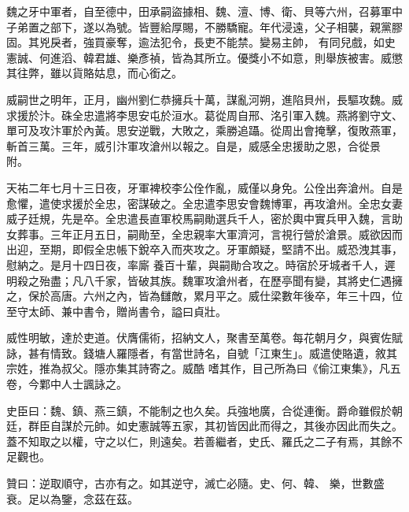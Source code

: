 \begin{pinyinscope}
 魏之牙中軍者，自至德中，田承嗣盜據相、魏、澶、博、衛、貝等六州，召募軍中子弟置之部下，遂以為號。皆豐給厚賜，不勝驕寵。年代浸遠，父子相襲，親黨膠固。其兇戾者，強買豪奪，逾法犯令，長吏不能禁。變易主帥，
 有同兒戲，如史憲誠、何進滔、韓君雄、樂彥禎，皆為其所立。優獎小不如意，則舉族被害。威懲其往弊，雖以貨賂姑息，而心銜之。



 威嗣世之明年，正月，幽州劉仁恭擁兵十萬，謀亂河朔，進陷貝州，長驅攻魏。威求援於汴。硃全忠遣將李思安屯於洹水。葛從周自邢、洺引軍入魏。燕將劉守文、單可及攻汴軍於內黃。思安逆戰，大敗之，乘勝追躡。從周出會掩擊，復敗燕軍，斬首三萬。三年，威引汴軍攻滄州以報之。自是，威感全忠援助之恩，合從景
 附。



 天祐二年七月十三日夜，牙軍裨校李公佺作亂，威僅以身免。公佺出奔滄州。自是愈懼，遣使求援於全忠，密謀破之。全忠遣李思安會魏博軍，再攻滄州。全忠女妻威子廷規，先是卒。全忠遣長直軍校馬嗣勛選兵千人，密於輿中實兵甲入魏，言助女葬事。三年正月五日，嗣勛至，全忠親率大軍濟河，言視行營於滄景。威欲因而出迎，至期，即假全忠帳下銳卒入而夾攻之。牙軍頗疑，堅請不出。威恐洩其事，慰納之。是月十四日夜，率廝
 養百十輩，與嗣勛合攻之。時宿於牙城者千人，遲明殺之殆盡；凡八千家，皆破其族。魏軍攻滄州者，在歷亭聞有變，其將史仁遇擁之，保於高唐。六州之內，皆為讎敵，累月平之。威仕梁數年後卒，年三十四，位至守太師、兼中書令，贈尚書令，謚曰貞壯。



 威性明敏，達於吏道。伏膺儒術，招納文人，聚書至萬卷。每花朝月夕，與賓佐賦詠，甚有情致。錢塘人羅隱者，有當世詩名，自號「江東生」。威遣使賂遺，敘其宗姓，推為叔父。隱亦集其詩寄之。威酷
 嗜其作，目己所為曰《偷江東集》，凡五卷，今鄴中人士諷詠之。



 史臣曰：魏、鎮、燕三鎮，不能制之也久矣。兵強地廣，合從連衡。爵命雖假於朝廷，群臣自謀於元帥。如史憲誠等五家，其初皆因此而得之，其後亦因此而失之。蓋不知取之以權，守之以仁，則遠矣。若善繼者，史氏、羅氏之二子有焉，其餘不足觀也。



 贊曰：逆取順守，古亦有之。如其逆守，滅亡必隨。史、何、韓、
 樂，世數盛衰。足以為鑒，念茲在茲。



\end{pinyinscope}